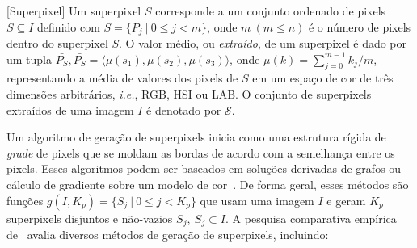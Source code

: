 \begin{definition}\label{def:superpixel}[Superpixel]
Um superpixel $S$ corresponde a um conjunto ordenado de pixels $S \subseteq I$ definido com $S = \{P_{j} ~|~ 0 \leq j < m \}$, onde $m ~(m \leq n)$ é o número de pixels dentro do superpixel $S$. 
O valor médio, ou \textit{extraído}, de um superpixel é dado por um tupla $\bar{P_S}, \bar{P_S} = \langle \mu(s_1), \mu(s_2), \mu(s_3)\rangle$, onde $\mu(k) = \sum_{j = 0}^{m-1} k_j/m$, representando a média de valores dos pixels de $S$ em um espaço de cor de três dimensões arbitrários, \textit{i.e.}, RGB, HSI ou LAB.
O conjunto de superpixels extraídos de uma imagem $I$ é denotado por $\mathcal{S}$.
\end{definition}

Um algoritmo de geração de superpixels inicia como uma estrutura rígida de \textit{grade} de pixels que se moldam as bordas de acordo com a semelhança entre os pixels.
Esses algoritmos podem ser baseados em soluções derivadas de grafos ou cálculo de gradiente sobre um modelo de cor~\cite{Felzenszwalb2004,Vedaldi2008}.
De forma geral, esses métodos são funções $g(I, K_p) = \{S_j ~|~ 0 \leq j < K_p\}$ que usam uma imagem $I$ e geram $K_p$ superpixels disjuntos e não-vazios $S_j, ~S_j \subset I$.
A pesquisa comparativa empírica de~ avalia diversos métodos de geração de superpixels, incluindo:

